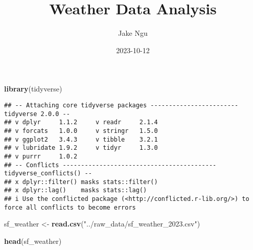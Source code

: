\documentclass[
]{article}
\title{Weather Data Analysis}
\author{Jake Ngu}
\date{2023-10-12}
\newenvironment{Shaded}{\begin{snugshade}}{\end{snugshade}}
\newcommand{\FunctionTok}[1]{\textcolor[rgb]{0.13,0.29,0.53}{\textbf{#1}}}
\newcommand{\NormalTok}[1]{#1}
\newcommand{\OtherTok}[1]{\textcolor[rgb]{0.56,0.35,0.01}{#1}}
\newcommand{\StringTok}[1]{\textcolor[rgb]{0.31,0.60,0.02}{#1}}
\begin{document}
\maketitle

\begin{Shaded}
\begin{Highlighting}[]
\FunctionTok{library}\NormalTok{(tidyverse)}
\end{Highlighting}
\end{Shaded}

\begin{verbatim}
## -- Attaching core tidyverse packages ------------------------ tidyverse 2.0.0 --
## v dplyr     1.1.2     v readr     2.1.4
## v forcats   1.0.0     v stringr   1.5.0
## v ggplot2   3.4.3     v tibble    3.2.1
## v lubridate 1.9.2     v tidyr     1.3.0
## v purrr     1.0.2     
## -- Conflicts ------------------------------------------ tidyverse_conflicts() --
## x dplyr::filter() masks stats::filter()
## x dplyr::lag()    masks stats::lag()
## i Use the conflicted package (<http://conflicted.r-lib.org/>) to force all conflicts to become errors
\end{verbatim}

\begin{Shaded}
\begin{Highlighting}[]
\NormalTok{sf\_weather }\OtherTok{\textless{}{-}} \FunctionTok{read.csv}\NormalTok{(}\StringTok{"../raw\_data/sf\_weather\_2023.csv"}\NormalTok{)}

\FunctionTok{head}\NormalTok{(sf\_weather)}
\end{Highlighting}
\end{Shaded}
\end{document}
